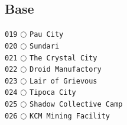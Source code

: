 \documentclass[a4paper,landscape]{article}
\begin{document}
\begin{multicols*}{5}
\section{Base} 
\vspace{-2mm} 
\texttt{019} \(\bigcirc\)  \texttt{Pau City} \vspace{-0.3mm}\\ 
\texttt{020} \(\bigcirc\)  \texttt{Sundari} \vspace{-0.3mm}\\ 
\texttt{021} \(\bigcirc\)  \texttt{The Crystal City} \vspace{-0.3mm}\\ 
\texttt{022} \(\bigcirc\)  \texttt{Droid Manufactory} \vspace{-0.3mm}\\ 
\texttt{023} \(\bigcirc\)  \texttt{Lair of Grievous} \vspace{-0.3mm}\\ 
\texttt{024} \(\bigcirc\)  \texttt{Tipoca City} \vspace{-0.3mm}\\ 
\texttt{025} \(\bigcirc\)  \texttt{Shadow Collective Camp} \vspace{-0.3mm}\\ 
\texttt{026} \(\bigcirc\)  \texttt{KCM Mining Facility} \vspace{-0.3mm}\\ 

\end{multicols*}
\end{document}
